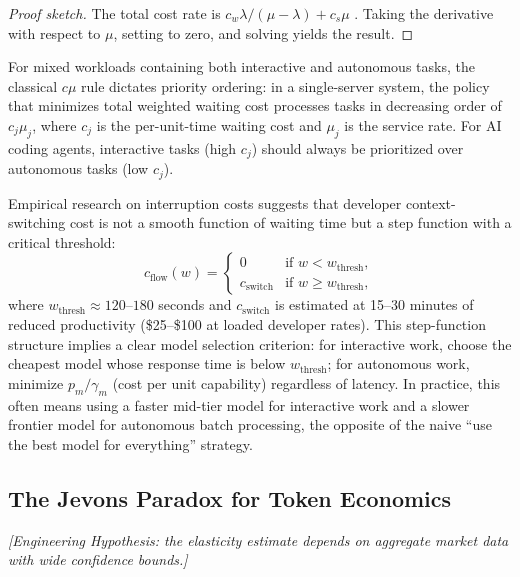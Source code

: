\begin{proof}[Proof sketch]
The total cost rate is $c_w \lambda / (\mu - \lambda) + c_s \mu$ \citep{kleinrock1975}. Taking the derivative with respect to $\mu$, setting to zero, and solving yields the result.
\end{proof}

For mixed workloads containing both interactive and autonomous tasks, the classical $c\mu$ rule \citep{vanmieghem1995} dictates priority ordering: in a single-server system, the policy that minimizes total weighted waiting cost processes tasks in decreasing order of $c_j \mu_j$, where $c_j$ is the per-unit-time waiting cost and $\mu_j$ is the service rate. For AI coding agents, interactive tasks (high $c_j$) should always be prioritized over autonomous tasks (low $c_j$).

Empirical research on interruption costs \citep{mark2008interrupted, leroy2009} suggests that developer context-switching cost is not a smooth function of waiting time but a step function with a critical threshold:
\begin{equation}\label{eq:econ-flow-state}
    c_{\text{flow}}(w) = \begin{cases}
        0 & \text{if } w < w_{\text{thresh}}, \\
        c_{\text{switch}} & \text{if } w \geq w_{\text{thresh}},
    \end{cases}
\end{equation}
where $w_{\text{thresh}} \approx 120$--$180$ seconds and $c_{\text{switch}}$ is estimated at 15--30 minutes of reduced productivity (\$25--\$100 at loaded developer rates). This step-function structure implies a clear model selection criterion: for interactive work, choose the cheapest model whose response time is below $w_{\text{thresh}}$; for autonomous work, minimize $p_m / \gamma_m$ (cost per unit capability) regardless of latency. In practice, this often means using a faster mid-tier model for interactive work and a slower frontier model for autonomous batch processing, the opposite of the naive ``use the best model for everything'' strategy.

\subsection{The Jevons Paradox for Token Economics}

\emph{[Engineering Hypothesis: the elasticity estimate depends on aggregate market data with wide confidence bounds.]}

